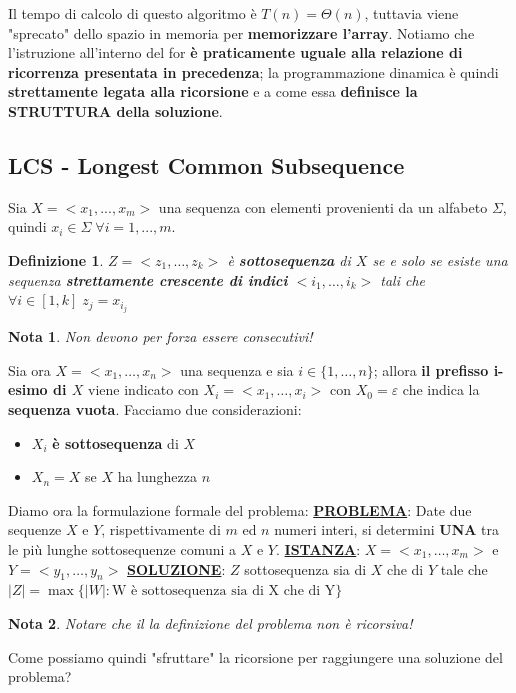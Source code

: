 \documentclass[12pt]{article}
\newtheorem{Definizione}{Definizione}[subsection]
\newtheorem{Nota}{Nota}[subsection]
\begin{document}
\noindent
Il tempo di calcolo di questo algoritmo è $T(n) = \Theta(n)$, tuttavia viene "sprecato" dello spazio in memoria per \textbf{memorizzare l'array}.
Notiamo che l'istruzione all'interno del for \textbf{è praticamente uguale alla relazione di ricorrenza presentata in precedenza}; la programmazione dinamica
è quindi \textbf{strettamente legata alla ricorsione} e a come essa \textbf{definisce la STRUTTURA della soluzione}.
\subsection{LCS - Longest Common Subsequence}
Sia $X = <x_1,...,x_m>$ una sequenza con elementi provenienti da un alfabeto $\Sigma$, quindi $x_i \in \Sigma \; \forall i = 1,...,m$.
\begin{Definizione}
    $Z = <z_1,\dots,z_k>$ è \textbf{sottosequenza} di $X$ se e solo se esiste una sequenza \textbf{strettamente crescente di indici} $<i_1,\dots,i_k>$ tali che $\forall i \in [1,k] \; z_j = x_{i_j}$
\end{Definizione}
\begin{Nota}
    Non devono per forza essere consecutivi!
\end{Nota}
Sia ora $X = <x_1,\dots,x_n>$ una sequenza e sia $i \in \{1,\dots,n\}$; allora
\textbf{il prefisso i-esimo di $X$} viene indicato con $X_i = <x_1,\dots,x_i>$ con $X_0 = \varepsilon$ che indica
\newpage
la \textbf{sequenza vuota}. Facciamo due considerazioni:
\begin{itemize}
    \item $X_i$ \textbf{è sottosequenza} di $X$
    \item $X_n = X$ se $X$ ha lunghezza $n$
\end{itemize}
Diamo ora la formulazione formale del problema: \newline
\textbf{\underline{PROBLEMA}}: Date due sequenze $X$ e $Y$, rispettivamente di $m$ ed $n$ numeri interi, si determini \textbf{UNA} tra le più lunghe sottosequenze comuni a $X$ e $Y$. \newline
\textbf{\underline{ISTANZA}}: $X = <x_1,\dots,x_m>$ e $Y = <y_1,\dots,y_n>$ \newline
\textbf{\underline{SOLUZIONE}}: $Z$ sottosequenza sia di $X$ che di $Y$ tale che \newline $|Z| = \max\{|W|: \textrm{W è sottosequenza sia di X che di Y}\}$
\begin{Nota}
    Notare che il la definizione del problema non è ricorsiva!
\end{Nota}
Come possiamo quindi "sfruttare" la ricorsione per raggiungere una soluzione del problema?
\end{document}
